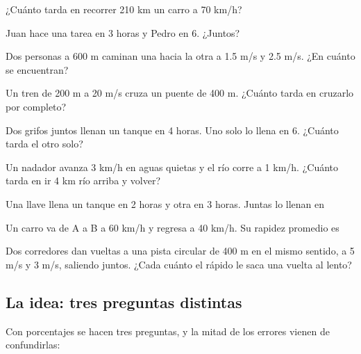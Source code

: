 \taller
{}
\begin{ejercicios}
\item ¿Cuánto tarda en recorrer 210 km un carro a 70 km/h? 
\item Juan hace una tarea en 3 horas y Pedro en 6. ¿Juntos? 
\item Dos personas a 600 m caminan una hacia la otra a 1.5 m/s y 2.5 m/s. ¿En cuánto se encuentran? 
\end{ejercicios}
\begin{ejercicios}
\item Un tren de 200 m a 20 m/s cruza un puente de 400 m. ¿Cuánto tarda en cruzarlo por completo? 
\item Dos grifos juntos llenan un tanque en 4 horas. Uno solo lo llena en 6. ¿Cuánto tarda el otro solo? 
\item Un nadador avanza 3 km/h en aguas quietas y el río corre a 1 km/h. ¿Cuánto tarda en ir 4 km río arriba y volver? 
\end{ejercicios}
\begin{ejercicios}
\item Una llave llena un tanque en 2 horas y otra en 3 horas. Juntas lo llenan en
\item Un carro va de A a B a 60 km/h y regresa a 40 km/h. Su rapidez promedio es
\item Dos corredores dan vueltas a una pista circular de 400 m en el mismo sentido, a 5 m/s y 3 m/s, saliendo juntos. ¿Cada cuánto el rápido le saca una vuelta al lento?
\end{ejercicios}

\bitacora


\subsection{La idea: tres preguntas distintas}
Con porcentajes se hacen tres preguntas, y la mitad de los errores vienen de confundirlas:

